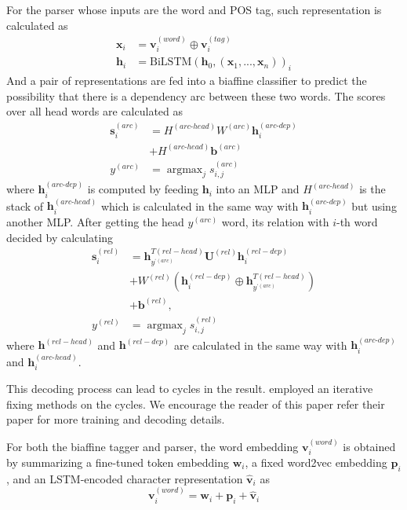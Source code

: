 \documentclass[11pt,a4paper]{article}
\DeclareMathOperator*{\argmax}{argmax}
\begin{document}
For the parser whose inputs are the word and POS tag,
such representation is calculated as
\begin{align*}
\mathbf{x}_i & =  \mathbf{v}_i^{(word)} \oplus \mathbf{v}_i^{(tag)} \\
\mathbf{h}_i & =  \text{BiLSTM}(\mathbf{h}_0, (\mathbf{x}_1, ..., \mathbf{x}_n))_i
\end{align*}
And a pair of representations are fed into a biaffine classifier
to predict the possibility that there is a dependency arc between these two words.
The scores over all head words are calculated as
\begin{align*}
\mathbf{s}_i^{(arc)} & = H^{(arc\text{-}head)} W^{(arc)} \mathbf{h}_i^{(arc\text{-}dep)} \\
& + H^{(arc\text{-}head)} \mathbf{b}^{(arc)} \\
y^{(arc)} & = \argmax_{j} s_{i, j}^{(arc)}
\end{align*}
where $\mathbf{h}_i^{(arc\text{-}dep)}$ is computed by feeding $\mathbf{h}_i$ into an MLP
and $H^{(arc\text{-}head)}$ is the stack of $\mathbf{h}_i^{(arc\text{-}head)}$
which is calculated in the same way with $\mathbf{h}_i^{(arc\text{-}dep)}$
but using another MLP.
After getting the head $y^{(arc)}$ word,
its relation with $i$-th word decided by calculating 
\begin{align*}
\mathbf{s}_i^{(rel)} & = \mathbf{h}^{T(rel-head)}_{y^{‘(arc)}} \mathbf{U}^{(rel)} \mathbf{h}_i^{(rel-dep)} \\
& + W^{(rel)} (\mathbf{h}_i^{(rel-dep)} \oplus \mathbf{h}^{T(rel-head)}_{y^{‘(arc)}}) \\
& + \mathbf{b}^{(rel)}, \\
y^{(rel)} & = \argmax_{j} s_{i, j}^{(rel)}
\end{align*}
where $\mathbf{h}^{(rel-head)}$ and $\mathbf{h}^{(rel-dep)}$
are calculated in the same way with $\mathbf{h}_i^{(arc\text{-}dep)}$ and $\mathbf{h}_i^{(arc\text{-}head)}$.

This decoding process can lead to cycles in the result.
\cite{dozat-qi-manning:2017:K17-3} employed an iterative fixing methods on the cycles.
We encourage the reader of this paper refer their paper for more training and decoding details.

For both the biaffine tagger and parser, 
the word embedding $\mathbf{v}_i^{(word)}$ is obtained by summarizing 
a fine-tuned token embedding $\mathbf{w}_i$, a fixed word2vec embedding $\mathbf{p}_i$, and an LSTM-encoded
character representation $\mathbf{\hat{v}}_i$ as
\[
\mathbf{v}_i^{(word)} = \mathbf{w}_i + \mathbf{p}_i + \mathbf{\hat{v}}_i
\]
\end{document}
